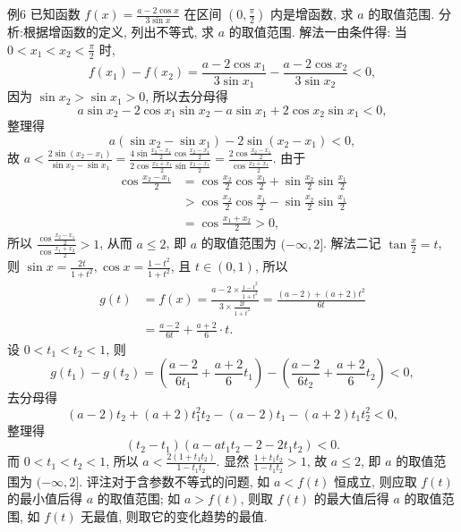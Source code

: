 例6 已知函数 $f(x)=\frac{a-2 \cos x}{3 \sin x}$ 在区间 $\left(0, \frac{\pi}{2}\right)$ 内是增函数, 求 $a$ 的取值范围.
分析:根据增函数的定义, 列出不等式, 求 $a$ 的取值范围.
解法一由条件得: 当 $0<x_1<x_2<\frac{\pi}{2}$ 时,
$$
f\left(x_1\right)-f\left(x_2\right)=\frac{a-2 \cos x_1}{3 \sin x_1}-\frac{a-2 \cos x_2}{3 \sin x_2}<0,
$$
因为 $\sin x_2>\sin x_1>0$, 所以去分母得
$$
a \sin x_2-2 \cos x_1 \sin x_2-a \sin x_1+2 \cos x_2 \sin x_1<0,
$$
整理得
$$
a\left(\sin x_2-\sin x_1\right)-2 \sin \left(x_2-x_1\right)<0,
$$
故 $a<\frac{2 \sin \left(x_2-x_1\right)}{\sin x_2-\sin x_1}=\frac{4 \sin \frac{x_2-x_1}{2} \cos \frac{x_2-x_1}{2}}{2 \cos \frac{x_2+x_1}{2} \sin \frac{x_2-x_1}{2}}=\frac{2 \cos \frac{x_2-x_1}{2}}{\cos \frac{x_2+x_1}{2}}$.
由于
$$
\begin{aligned}
\cos \frac{x_2-x_1}{2} & =\cos \frac{x_2}{2} \cos \frac{x_1}{2}+\sin \frac{x_2}{2} \sin \frac{x_1}{2} \\
& >\cos \frac{x_2}{2} \cos \frac{x_1}{2}-\sin \frac{x_2}{2} \sin \frac{x_1}{2} \\
& =\cos \frac{x_1+x_2}{2}>0,
\end{aligned}
$$
所以 $\frac{\cos \frac{x_2-x_1}{2}}{\cos \frac{x_1+x_2}{2}}>1$, 从而 $a \leqslant 2$, 即 $a$ 的取值范围为 $(-\infty, 2]$.
解法二记 $\tan \frac{x}{2}=t$, 则 $\sin x=\frac{2 t}{1+t^2}, \cos x=\frac{1-t^2}{1+t^2}$, 且 $t \in(0,1)$,
所以
$$
\begin{aligned}
g(t) & =f(x)=\frac{a-2 \times \frac{1-t^2}{1+t^2}}{3 \times \frac{2 t}{1+t^2}}=\frac{(a-2)+(a+2) t^2}{6 t} \\
& =\frac{a-2}{6 t}+\frac{a+2}{6} \cdot t .
\end{aligned}
$$
设 $0<t_1<t_2<1$, 则
$$
g\left(t_1\right)-g\left(t_2\right)=\left(\frac{a-2}{6 t_1}+\frac{a+2}{6} t_1\right)-\left(\frac{a-2}{6 t_2}+\frac{a+2}{6} t_2\right)<0,
$$
去分母得
$$
(a-2) t_2+(a+2) t_1^2 t_2-(a-2) t_1-(a+2) t_1 t_2^2<0,
$$
整理得
$$
\left(t_2-t_1\right)\left(a-a t_1 t_2-2-2 t_1 t_2\right)<0 .
$$
而 $0<t_1<t_2<1$, 所以 $a<\frac{2\left(1+t_1 t_2\right)}{1-t_1 t_2}$.
显然 $\frac{1+t_1 t_2}{1-t_1 t_2}>1$, 故 $a \leqslant 2$, 即 $a$ 的取值范围为 $(-\infty, 2]$.
评注对于含参数不等式的问题, 如 $a<f(t)$ 恒成立, 则应取 $f(t)$ 的最小值后得 $a$ 的取值范围; 如 $a>f(t)$, 则取 $f(t)$ 的最大值后得 $a$ 的取值范围, 如 $f(t)$ 无最值, 则取它的变化趋势的最值.



